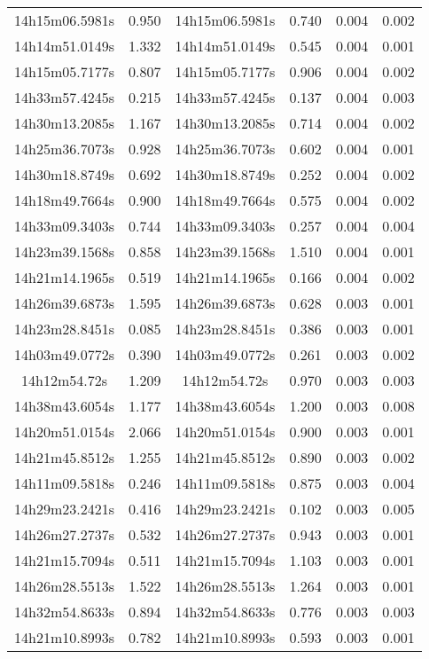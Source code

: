 \begin{table}
\begin{tabular}{cccccc}
14h15m06.5981s & 0.950 & 14h15m06.5981s & 0.740 & 0.004 & 0.002 \\
14h14m51.0149s & 1.332 & 14h14m51.0149s & 0.545 & 0.004 & 0.001 \\
14h15m05.7177s & 0.807 & 14h15m05.7177s & 0.906 & 0.004 & 0.002 \\
14h33m57.4245s & 0.215 & 14h33m57.4245s & 0.137 & 0.004 & 0.003 \\
14h30m13.2085s & 1.167 & 14h30m13.2085s & 0.714 & 0.004 & 0.002 \\
14h25m36.7073s & 0.928 & 14h25m36.7073s & 0.602 & 0.004 & 0.001 \\
14h30m18.8749s & 0.692 & 14h30m18.8749s & 0.252 & 0.004 & 0.002 \\
14h18m49.7664s & 0.900 & 14h18m49.7664s & 0.575 & 0.004 & 0.002 \\
14h33m09.3403s & 0.744 & 14h33m09.3403s & 0.257 & 0.004 & 0.004 \\
14h23m39.1568s & 0.858 & 14h23m39.1568s & 1.510 & 0.004 & 0.001 \\
14h21m14.1965s & 0.519 & 14h21m14.1965s & 0.166 & 0.004 & 0.002 \\
14h26m39.6873s & 1.595 & 14h26m39.6873s & 0.628 & 0.003 & 0.001 \\
14h23m28.8451s & 0.085 & 14h23m28.8451s & 0.386 & 0.003 & 0.001 \\
14h03m49.0772s & 0.390 & 14h03m49.0772s & 0.261 & 0.003 & 0.002 \\
14h12m54.72s & 1.209 & 14h12m54.72s & 0.970 & 0.003 & 0.003 \\
14h38m43.6054s & 1.177 & 14h38m43.6054s & 1.200 & 0.003 & 0.008 \\
14h20m51.0154s & 2.066 & 14h20m51.0154s & 0.900 & 0.003 & 0.001 \\
14h21m45.8512s & 1.255 & 14h21m45.8512s & 0.890 & 0.003 & 0.002 \\
14h11m09.5818s & 0.246 & 14h11m09.5818s & 0.875 & 0.003 & 0.004 \\
14h29m23.2421s & 0.416 & 14h29m23.2421s & 0.102 & 0.003 & 0.005 \\
14h26m27.2737s & 0.532 & 14h26m27.2737s & 0.943 & 0.003 & 0.001 \\
14h21m15.7094s & 0.511 & 14h21m15.7094s & 1.103 & 0.003 & 0.001 \\
14h26m28.5513s & 1.522 & 14h26m28.5513s & 1.264 & 0.003 & 0.001 \\
14h32m54.8633s & 0.894 & 14h32m54.8633s & 0.776 & 0.003 & 0.003 \\
14h21m10.8993s & 0.782 & 14h21m10.8993s & 0.593 & 0.003 & 0.001 \\

\end{tabular}
\end{table}
